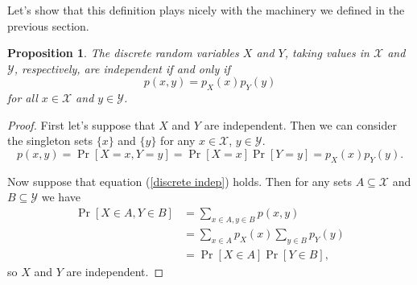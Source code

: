 \documentclass[12pt]{article}
\theoremstyle{plain}
\newtheorem{proposition}[theorem]{Proposition}
\theoremstyle{definition}
\theoremstyle{remark}
\begin{document}
Let's show that this definition plays nicely with the machinery we defined in the previous section.

\begin{proposition}
    The discrete random variables $X$ and $Y$, taking values in $\mathcal X$ and $\mathcal Y$, respectively, are independent if and only if
    \begin{equation}\label{discrete indep}
        p(x,y) = p_X(x)p_Y(y)
    \end{equation}
    for all $x\in \mathcal X$ and $y\in \mathcal Y$.
\end{proposition}
\begin{proof}
    First let's suppose that $X$ and $Y$ are independent.
    Then we can consider the singleton sets $\{x\}$ and $\{y\}$ for any $x\in \mathcal X$, $y\in \mathcal Y$.
    \[
        p(x,y) = \Pr[X = x, Y=y] = \Pr[X=x]\Pr[Y=y] = p_X(x)p_Y(y).
    \]

    Now suppose that equation (\ref{discrete indep}) holds.
    Then for any sets $A\subseteq \mathcal X$ and $B\subseteq \mathcal Y$ we have
    \begin{align*}
        \Pr[X\in A, Y\in B] &= \sum_{x\in A, y\in B}p(x,y)\\
        &= \sum_{x\in A}p_X(x)\sum_{y\in B}p_Y(y)\\
        &= \Pr[X\in A]\Pr[Y\in B],
    \end{align*}
    so $X$ and $Y$ are independent.
\end{proof}
\end{document}
